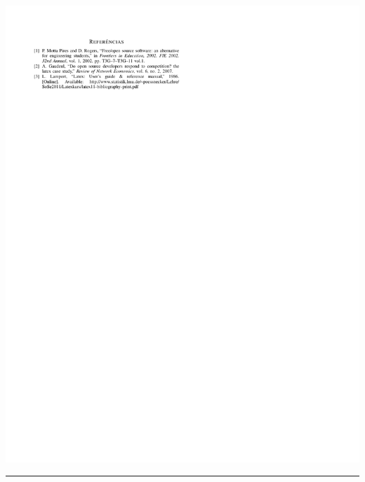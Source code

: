 {\clearpage
\label{referencias}

\noindent\includegraphics[trim=0 19cm 0 0,clip]{contents/intro_writing_conference/references/ieee-refs}

\hrule

}
